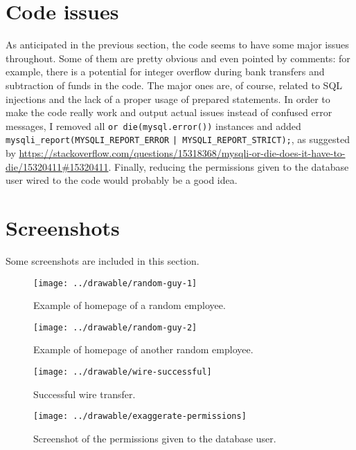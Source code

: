 \documentclass[a4paper,11pt,hidelinks]{article}
\begin{document}
\section{Code issues}

As anticipated in the previous section, the code seems to have some major issues throughout. Some of them are pretty obvious and even pointed by comments: for example, there is a potential for integer overflow during bank transfers and subtraction of funds in the code. The major ones are, of course, related to SQL injections and the lack of a proper usage of prepared statements. In order to make the code really work and output actual issues instead of confused error messages, I removed all \verb=or die(mysql.error())= instances and added \verb=mysqli_report(MYSQLI_REPORT_ERROR= \verb=| MYSQLI_REPORT_STRICT);=, as suggested by \url{https://stackoverflow.com/questions/15318368/mysqli-or-die-does-it-have-to-die/15320411#15320411}. Finally, reducing the permissions given to the database user wired to the code would probably be a good idea.


\section{Screenshots}

Some screenshots are included in this section.

\begin{figure}[hb!]
  \centering
  \texttt{[image: ../drawable/random-guy-1]}
  \caption{Example of homepage of a random employee.}
\end{figure}

\begin{figure}[hb!]
  \centering
  \texttt{[image: ../drawable/random-guy-2]}
  \caption{Example of homepage of another random employee.}
\end{figure}

\begin{figure}[hb!]
  \centering
  \texttt{[image: ../drawable/wire-successful]}
  \caption{Successful wire transfer.}
\end{figure}

\begin{figure}[hb!]
  \centering
  \texttt{[image: ../drawable/exaggerate-permissions]}
  \caption{Screenshot of the permissions given to the database user.}
\end{figure}

\endgroup
\end{document}
